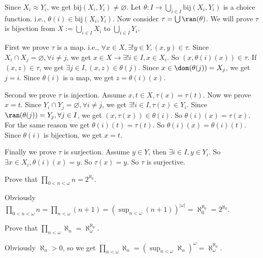 \documentclass{ctexart}
\begin{document}
\begin{solution}
  Since \(X_i \approx Y_i\), we get \(\text{bij}(X_i,Y_i)\neq \varnothing\). 
  Let \(\theta:I \to \bigcup_{i \in I} \text{bij}(X_i,Y_i)\) is a choice function. i.e., \(\theta(i)\in \text{bij}(X_i,Y_i)\). 
  Now consider \(\tau=\bigcup \ran(\theta) \). We will prove \(\tau\) is bijection from \(X:=\bigcup_{i \in I} X_i\) to \(\bigcup_{i \in I} Y_i\). 

  First we prove \(\tau\) is a map. i.e., \(\forall x \in X,\exists ! y \in Y,(x,y)\in \tau\). 
  Since \(X_i \cap X_j = \varnothing , \forall i \neq j\), we get \(x \in X \to \exists ! i \in I,x \in X_i\). 
  So \((x,\theta(i)(x)) \in \tau\). If \((x,z)\in \tau\), we get \(\exists j \in I,(x,z)\in \theta(j)\). 
  Since \(x \in\dom(\theta(j))=X_j\), we get \(j=i\). Since \(\theta(i)\) is a map, we get \(z = \theta(i)(x)\). 

  Second we prove \(\tau\) is injection. Assume \(x,t \in X,\tau(x)=\tau(t)\). Now we prove \(x=t\). 
  Since \(Y_i \cap Y_j=\varnothing,\forall i \neq j\), we get \(\exists ! i \in I,\tau(x) \in Y_i\). 
  Since \(\ran(\theta(j))=Y_j,\forall j \in I\), we get \((x,\tau(x)) \in \theta(i)\). So \(\theta(i)(x)=\tau(x)\). 
  For the same reason we get \(\theta(i)(t)=\tau(t)\). So \(\theta(i)(x)=\theta(i)(t)\). 
  Since \(\theta(i)\) is bijection, we get \(x=t\). 

  Finally we prove \(\tau\) is surjection. Assume \(y \in Y\), then \(\exists i \in I,y \in Y_i\). 
  So \(\exists x \in X_i,\theta(i)(x)=y\). So \(\tau(x)=y\). So \(\tau\) is surjective. 
\end{solution}

\begin{problem}
  Prove that \(\prod_{0 < n < \omega} n=2^{\aleph_0}\). 
\end{problem}

\begin{solution}
  Obviously \(\prod_{0 < n < \omega} n=\prod_{n < \omega} (n+1)=\left(\sup_{n<\omega}(n+1) \right)^{|\omega|}=\aleph_0^{\aleph_0}=2^{\aleph_0} \). 
\end{solution}

\begin{problem}
  Prove that \(\prod_{n<\omega} \aleph_n=\aleph_\omega^{\aleph_0}\). 
\end{problem}

\begin{solution}
  Obviously \(\aleph_n>0\), so we get \(\prod_{n<\omega} \aleph_n = \left(\sup_{n<\omega}\aleph_n\right)^{\omega}=\aleph_\omega^{\aleph_0}\). 
\end{solution}
\end{document}
